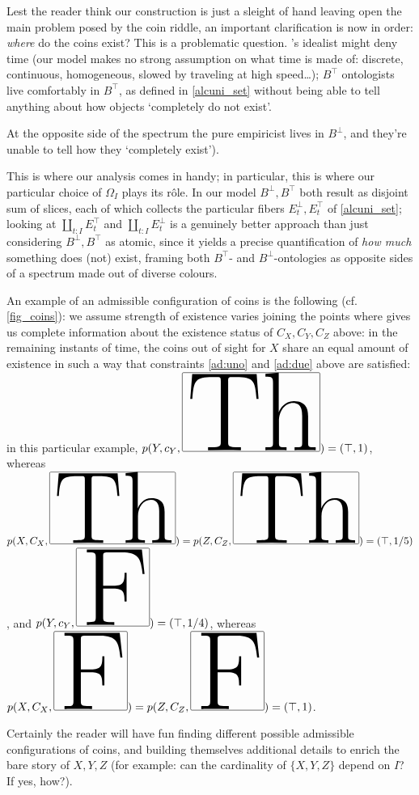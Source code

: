 \begin{remark}
	Lest the reader think our construction is just a sleight of hand leaving open the main problem posed by the coin riddle, an important clarification is now in order: \emph{where} do the coins exist? This is a problematic question. \tlon's idealist might deny time (our model makes no strong assumption on what time is made of: discrete, continuous, homogeneous, slowed by traveling at high speed\dots); $B^\top$ ontologists live comfortably in $B^\top$, as defined in \autoref{alcuni_set} without being able to tell anything about how objects `completely do not exist'.

	At the opposite side of the spectrum the pure empiricist lives in $B^\bot$, and they're unable to tell how they `completely exist').

	This is where our analysis comes in handy; in particular, this is where our particular choice of $\Omega_I$ plays its r\^ole. In our model $B^\perp, B^\top$ both result as disjoint sum of slices, each of which collects the particular fibers $E_t^\perp, E_t^\top$ of \ref{alcuni_set}; looking at $ \coprod_{t : I} E_t^\top$ and $ \coprod_{t : I} E_t^\bot$ is a genuinely better approach than just considering $B^\perp, B^\top$ as atomic, since it yields a precise quantification of \emph{how much} something does (not) exist, framing both $B^\top$- and $B^\bot$-ontologies as opposite sides of a spectrum made out of diverse colours.
\end{remark}
\begin{example}
	An example of an admissible configuration of coins is the following (cf. \autoref{fig_coins}): we assume strength of existence varies joining the points where \cite{Borges1963} gives us complete information about the existence status of $C_X,C_Y,C_Z$ above: in the remaining instants of time, the coins out of sight for $X$ share an equal amount of existence in such a way that constraints \ref{ad:uno} and \ref{ad:due} above are satisfied: in this particular example, $p(Y,c_Y,\Th) = (\top,1)$, whereas $p(X,C_X,\Th)=p(Z,C_Z,\Th)=(\top,1/5)$, and $p(Y,c_Y,\F)=(\top,1/4)$, whereas $p(X,C_X,\F)=p(Z,C_Z,\F)=(\top,1)$.

	Certainly the reader will have fun finding different possible admissible configurations of coins, and building themselves additional details to enrich the bare story of $X,Y,Z$ (for example: can the cardinality of $\{X,Y,Z\}$ depend on $I$? If yes, how?).
\end{example}

